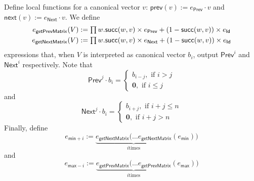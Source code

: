 Define local functions for a canonical vector $v$: $\mathsf{prev}(v):=e_{\mathsf{Prev}}\cdot v$ and $\mathsf{next}(v):=e_{\mathsf{Next}}\cdot v$.
We define
\begin{align*}
    e_{\mathsf{getPrevMatrix}}(V)&:=\textstyle\prod w. \mathsf{succ}(w,v)\times e_{\mathsf{Prev}} + (1 - \mathsf{succ}(w,v))\times e_{\mathsf{Id}}\\
    e_{\mathsf{getNextMatrix}}(V)&:=\textstyle\prod w. \mathsf{succ}(w,v)\times e_{\mathsf{Next}} + (1 - \mathsf{succ}(w,v))\times e_{\mathsf{Id}}
\end{align*}
expressions that, when $V$ is interpreted as canonical vector $b_i$, output $\mathsf{Prev}^i$ and $\mathsf{Next}^i$ respectively.
Note that
\[
\mathsf{Prev}^j\cdot b_i=\begin{cases}
               b_{i-j}, \text{ if } i > j \\
              \mathbf{0}, \text{ if } i \leq j
            \end{cases}
\]
and
\[
\mathsf{Next}^j\cdot b_i=\begin{cases}
               b_{i+j}, \text{ if } i + j \leq n \\
              \mathbf{0}, \text{ if } i + j > n
            \end{cases}
\]
Finally, define
$$
e_{\mathsf{min}+i}:=\underbrace{e_{\mathsf{getNextMatrix}}(\ldots e_{\mathsf{getNextMatrix}}}_{i \text{times}}(e_{\mathsf{min}}))
$$
and
$$
e_{\mathsf{max}-i}:=\underbrace{e_{\mathsf{getPrevMatrix}}(\ldots e_{\mathsf{getPrevMatrix}}}_{i \text{times}}(e_{\mathsf{max}}))
$$